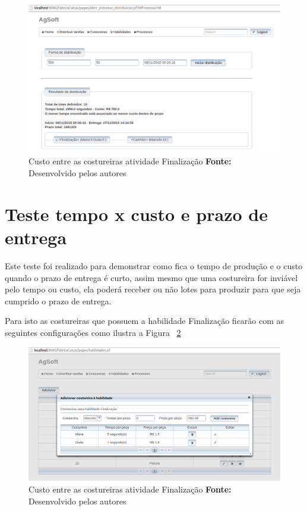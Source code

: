 \begin{figure}[h!]
	\centerline{\includegraphics[scale=0.4]{./imagens/resultado_tudo_igual_teste2.png}}
	\caption[Custo entre as costureiras atividade Finalização]
	{Custo entre as costureiras atividade Finalização \textbf{Fonte:} Desenvolvido pelos autores}
	\label{fig:resultado_tudo_igual}
\end{figure}

\section{Teste tempo x custo e prazo de entrega}

\par Este teste foi realizado para demonstrar como fica o tempo de
produção e o custo quando o prazo de entrega é curto,
assim mesmo que uma costureira for inviável pelo tempo ou custo, ela poderá
receber ou não lotes para produzir para que seja cumprido o prazo de entrega.

\par Para isto as costureiras que possuem a habilidade Finalização ficarão com
as seguintes configurações como ilustra a Figura
~\ref{fig:configuracao_habilidade_costureira_teste3}

\newpage

\begin{figure}[h!]
	\centerline{\includegraphics[scale=0.4]{./imagens/cofiguracao_habilidade_teste3.png}}
	\caption[Custo entre as costureiras atividade Finalização]
	{Custo entre as costureiras atividade Finalização \textbf{Fonte:} Desenvolvido pelos autores}
	\label{fig:configuracao_habilidade_costureira_teste3}
\end{figure}


